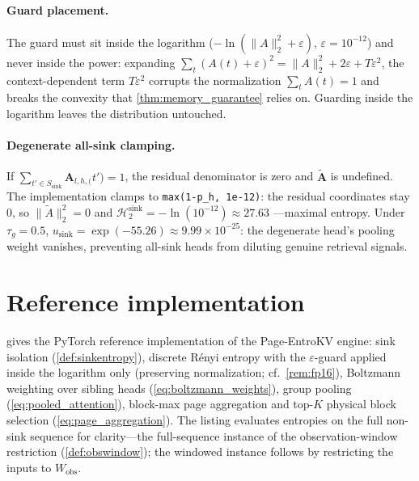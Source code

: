 \documentclass[final,5p,times,twocolumn]{elsarticle}
\theoremstyle{definition}
\theoremstyle{remark}
\newcommand{\method}{Page-EntroKV}
\newcommand{\Attn}[2]{\mathbf{A}_{#1,#2}}
\newcommand{\Ssink}{S_{\mathrm{sink}}}
\newcommand{\Hsink}{\mathcal{H}^{\mathrm{sink}}_{2}}
\begin{document}
\paragraph{Guard placement.}
The guard must sit inside the logarithm
($-\ln(\|A\|_2^2 + \varepsilon)$, $\varepsilon = 10^{-12}$) and never
inside the power: expanding
 $\sum_t(A(t)+\varepsilon)^2 = \|A\|_2^2 + 2\varepsilon +
T\varepsilon^2$, the context-dependent term $T\varepsilon^2$ corrupts
the normalization $\sum_t A(t) = 1$ and breaks the convexity that
\cref{thm:memory_guarantee} relies on. Guarding inside the logarithm
leaves the distribution untouched.

\paragraph{Degenerate all-sink clamping.}
If $\sum_{t'\in\Ssink}\Attn{l,h}(t') = 1$, the residual denominator is
zero and $\tilde{\mathbf{A}}$ is undefined. The implementation clamps
to \texttt{max(1-p\_h, 1e-12)}: the residual coordinates stay $0$, so
 $\|\tilde A\|_2^2 = 0$ and $\Hsink = -\ln(10^{-12}) \approx 27.63$%
---maximal entropy. Under $\tau_g = 0.5$,
 $u_{\mathrm{sink}} = \exp(-55.26) \approx 9.99\times 10^{-25}$: the
degenerate head's pooling weight vanishes, preventing all-sink heads
from diluting genuine retrieval signals.

\section{Reference implementation}
\label{app:implementation}

 gives the PyTorch reference implementation of
the \method{} engine: sink isolation (\cref{def:sinkentropy}), discrete
R\'enyi entropy with the $\varepsilon$-guard applied inside the
logarithm only (preserving normalization; cf.\ \cref{rem:fp16}),
Boltzmann weighting over sibling heads (\cref{eq:boltzmann_weights}),
group pooling (\cref{eq:pooled_attention}), block-max page aggregation
and top-$K$ physical block selection (\cref{eq:page_aggregation}). The
listing evaluates entropies on the full non-sink sequence for
clarity---the full-sequence instance of the observation-window
restriction (\cref{def:obswindow}); the windowed instance follows by
restricting the inputs to $W_{\mathrm{obs}}$.
\end{document}
